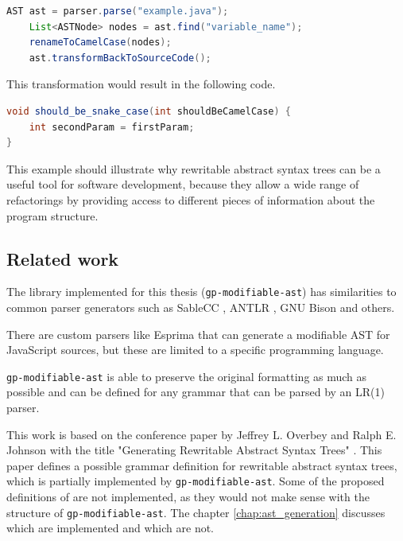 \begin{lstlisting}[language=Java, caption=Example of transformation]
    AST ast = parser.parse("example.java");
    List<ASTNode> nodes = ast.find("variable_name");
    renameToCamelCase(nodes);
    ast.transformBackToSourceCode();
\end{lstlisting}

This transformation would result in the following code.

\begin{lstlisting}[language=Java, caption=Example of transformation]
void should_be_snake_case(int shouldBeCamelCase) {
    int secondParam = firstParam;
}
\end{lstlisting}

This example should illustrate why rewritable abstract syntax trees can be a useful tool for software development, 
because they allow a wide range of refactorings by providing access to different pieces of information about the program structure.

\subsection{Related work}

The library implemented for this thesis (\verb|gp-modifiable-ast|) has similarities to common parser generators 
such as SableCC \cite{sablecc}, ANTLR \cite{antlr}, GNU Bison \cite{gnu-bison} and others.

There are custom parsers like Esprima \cite{esprima} that can generate a modifiable AST for JavaScript sources, 
but these are limited to a specific programming language.

\verb|gp-modifiable-ast| is able to preserve the original formatting as much as possible and 
can be defined for any grammar that can be parsed by an LR(1) parser.

This work is based on the conference paper by Jeffrey L. Overbey and Ralph E. Johnson with the title 
"Generating Rewritable Abstract Syntax Trees" \cite{GeneratingRewritableAST}.
This paper defines a possible grammar definition for rewritable abstract syntax trees, which is partially implemented by \verb|gp-modifiable-ast|. 
Some of the proposed definitions of \cite{GeneratingRewritableAST} are not implemented, as they would not make sense with the
structure of \verb|gp-modifiable-ast|. The chapter \ref{chap:ast_generation} discusses which are implemented and which are not.